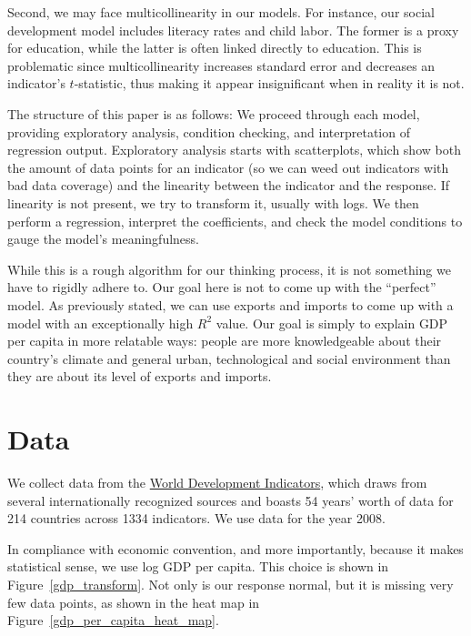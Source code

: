 \documentclass[12pt]{article}
\begin{document}
Second, we may face multicollinearity in our models. For instance, our social development model includes literacy rates and child labor. The former is a proxy for education, while the latter is often linked directly to education. This is problematic since multicollinearity increases standard error and decreases an indicator's $t$-statistic, thus making it appear insignificant when in reality it is not.

The structure of this paper is as follows: We proceed through each model, providing exploratory analysis, condition checking, and interpretation of regression output. Exploratory analysis starts with scatterplots, which show both the amount of data points for an indicator (so we can weed out indicators with bad data coverage) and the linearity between the indicator and the response. If linearity is not present, we try to transform it, usually with logs. We then perform a regression, interpret the coefficients, and check the model conditions to gauge the model's meaningfulness.

While this is a rough algorithm for our thinking process, it is not something we have to rigidly adhere to. Our goal here is not to come up with the ``perfect'' model. As previously stated, we can use exports and imports to come up with a model with an exceptionally high $R^2$ value. Our goal is simply to explain GDP per capita in more relatable ways: people are more knowledgeable about their country's climate and general urban, technological and social environment than they are about its level of exports and imports.


\section{Data}
We collect data from the \href{http://data.worldbank.org/indicator}{World Development Indicators}, 
which draws from several internationally recognized sources and boasts 54 years' worth of data for 214 countries across 1334 indicators.
We use data for the year 2008.\endnotemark[1]

In compliance with economic convention, and more importantly, because it makes statistical sense, we use log GDP per capita. This choice is shown in Figure~\ref{gdp_transform}. Not only is our response normal, but it is missing very few data points, as shown in the heat map in Figure~\ref{gdp_per_capita_heat_map}.
\end{document}
